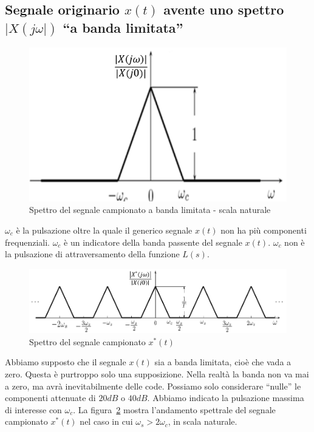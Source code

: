\documentclass[a4paper]{report}
\begin{document}
\subsection{Segnale originario $x(t)$ avente uno spettro $|X(j
  \omega|)$ ``a banda limitata''}
\begin{figure}[!h]
  \begin{center}
    \includegraphics[scale=0.3]{./figures/spettroSegnaleCampionatoBandaLimitata.png}
    \caption{Spettro del segnale campionato a banda
      limitata - scala naturale}\label{fig:spettroSegnaleCampionatoBandaLimitata} 
  \end{center}
\end{figure}
$\omega_c$ \`e la pulsazione oltre la quale il generico segnale $x(t)$
non ha pi\`u componenti frequenziali. $\omega_c$ \`e un indicatore della
banda passente del segnale $x(t)$. $\omega_c$ non \`e la pulsazione di
attraversamento della funzione $L(s)$.
\begin{figure}[!h]
  \begin{center}
    \includegraphics[scale=0.3]{./figures/spettroSegnaleCampionatoBandaLimitata01.png}
    \caption{Spettro del segnale campionato
      $x^{*}(t)$}\label{fig:spettroSegnaleCampionatoBandaLimitata01}    
  \end{center}
\end{figure}

Abbiamo supposto che il segnale $x(t)$ sia a banda limitata, cio\`e
che vada a zero. Questa \`e purtroppo solo una supposizione. Nella
realt\`a la banda non va mai a zero, ma avr\`a inevitabilmente delle
code. Possiamo solo considerare ``nulle'' le componenti attenuate di 
$20dB$ o $40dB$. Abbiamo indicato la pulsazione massima di interesse
con $\omega_c$. La
figura~\ref{fig:spettroSegnaleCampionatoBandaLimitata01} mostra
l'andamento spettrale del segnale campionato $x^{*}(t)$ nel caso in
cui $\omega_s > 2 \omega_c$, in scala naturale.
\end{document}
